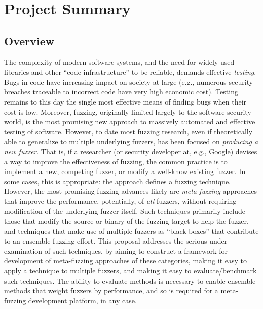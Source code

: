 \section{Project Summary}
\subsection*{Overview}
\vspace{-2mm}

\cut{
}


The complexity of modern software systems, and the need for widely used 
libraries and other ``code infrastructure'' to be reliable, demands effective 
\emph{testing}.  Bugs in code have increasing impact on society at large (e.g., 
numerous security breaches traceable to incorrect code have very high economic 
cost).  Testing remains to this day the single most effective means of finding 
bugs when their cost is low.   Moreover, fuzzing, originally limited largely to 
the software security world, is the most promising new approach to massively 
automated and effective testing of software.   However, to date most fuzzing 
research, even if theoretically able to generalize to multiple underlying 
fuzzers, has been focused on \emph{producing a new fuzzer}.  That is, if a 
researcher (or security developer at, e.g., Google) devises a way to improve 
the effectiveness of fuzzing, the common practice is to implement a new, 
competing fuzzer, or modify a well-know existing fuzzer.  In some cases, this 
is appropriate: the approach defines a fuzzing technique.  However, the most 
promising fuzzing advances likely are \emph{meta-fuzzing} approaches that 
improve the performance, potentially, of \emph{all} fuzzers, without requiring 
modification of the underlying fuzzer itself.  Such techniques primarily 
include those that modify the source or binary of the fuzzing target to help 
the fuzzer, and techniques that make use of multiple fuzzers as ``black boxes'' 
that contribute to an ensemble fuzzing effort.  This proposal addresses the 
serious under-examination of such techniques, by aiming to construct a 
framework for development of meta-fuzzing approaches of these categories, 
making it easy to apply a technique to multiple fuzzers, and making it easy to 
evaluate/benchmark such techniques.  The ability to evaluate methods is 
necessary to enable ensemble methods that weight fuzzers by performance, and so 
is required for a meta-fuzzing development platform, in any case.

